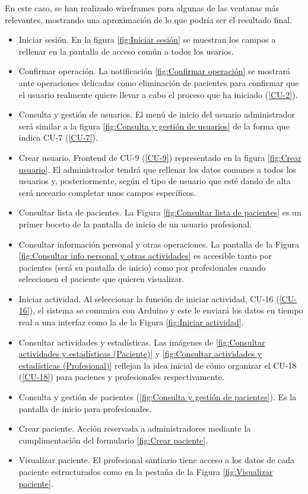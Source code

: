 En este caso, se han realizado wireframes para algunas de las ventanas más relevantes, mostrando una aproximación de lo que podría ser el resultado final.
\begin{itemize}
    \item Iniciar sesión. En la figura \ref{fig:Iniciar sesión} se muestran los campos a rellenar en la pantalla de acceso común a todos los usarios.
    \item Confirmar operación. La notificación \ref{fig:Confirmar operación} se mostrará ante operaciones delicadas como eliminación de pacientes para confirmar que el usuario realmente quiere llevar a cabo el proceso que ha iniciado (\ref{CU-2}).
    \item Consulta y gestión de usuarios. El menú de inicio del usuario administrador será similar a la figura \ref{fig:Consulta y gestión de usuarios} de la forma que indica CU-7 (\ref{CU-7}).
    \item Crear usuario. Frontend de CU-9 (\ref{CU-9}) representado en la figura \ref{fig:Crear usuario}. El administrador tendrá que rellenar los datos comunes a todos los usuarios y, posteriormente, según el tipo de usuario que esté dando de alta será neceario completar unos campos específicos.
    \item Consultar lista de pacientes. La Figura \ref{fig:Consultar lista de pacientes} es un primer boceto de la pantalla de inicio de un usuario profesional.
    \item Consultar información personal y otras operaciones. La pantalla de la Figura \ref{fig:Consultar info personal y otras actividades} es accesible tanto por pacientes (será su pantalla de inicio) como por profesionales cuando seleccionen el paciente que quieren visualizar.
    \item Iniciar actividad. Al seleccionar la función de iniciar actividad, CU-16 (\ref{CU-16}), el sistema se comunica con Arduino y este le enviará los datos en tiempo real a una interfaz como la de la Figura \ref{fig:Iniciar actividad}.
    \item Consultar actividades y estadísticas. Las imágenes de \ref{fig:Consultar actividades y estadísticas (Paciente)} y \ref{fig:Consultar actividades y estadísticas (Profesional)} reflejan la idea inicial de cómo organizar el CU-18 (\ref{CU-18}) para pacienes y profesionales respectivamente.
    \item Consulta y gestión de pacientes (\ref{fig:Consulta y gestión de pacientes}). Es la pantalla de inicio para profesionales.
    \item Crear paciente. Acción reservada a administradores mediante la cumplimentación del formulario \ref{fig:Crear paciente}. 
    \item Visualizar paciente. El profesional santiario tiene acceso a los datos de cada paciente estructurados como en la pestaña de la Figura \ref{fig:Visualizar paciente}.
\end{itemize}


